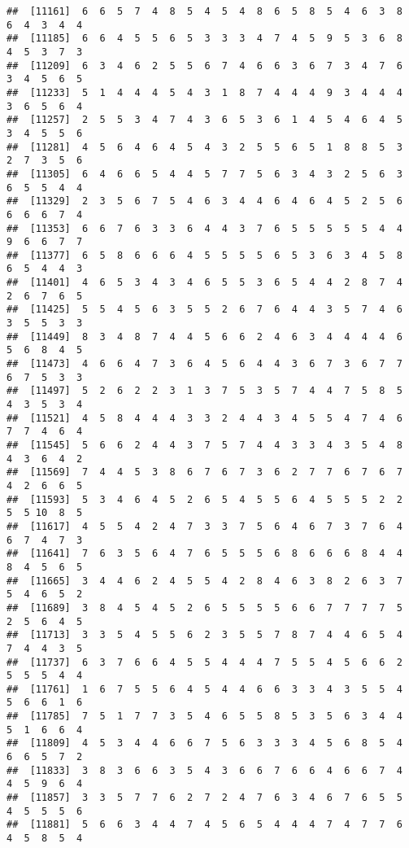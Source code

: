 \documentclass[
]{book}
\begin{document}
\begin{verbatim}
##  [11161]  6  6  5  7  4  8  5  4  5  4  8  6  5  8  5  4  6  3  8  6  4  3  4  4
##  [11185]  6  6  4  5  5  6  5  3  3  3  4  7  4  5  9  5  3  6  8  4  5  3  7  3
##  [11209]  6  3  4  6  2  5  5  6  7  4  6  6  3  6  7  3  4  7  6  3  4  5  6  5
##  [11233]  5  1  4  4  4  5  4  3  1  8  7  4  4  4  9  3  4  4  4  3  6  5  6  4
##  [11257]  2  5  5  3  4  7  4  3  6  5  3  6  1  4  5  4  6  4  5  3  4  5  5  6
##  [11281]  4  5  6  4  6  4  5  4  3  2  5  5  6  5  1  8  8  5  3  2  7  3  5  6
##  [11305]  6  4  6  6  5  4  4  5  7  7  5  6  3  4  3  2  5  6  3  6  5  5  4  4
##  [11329]  2  3  5  6  7  5  4  6  3  4  4  6  4  6  4  5  2  5  6  6  6  6  7  4
##  [11353]  6  6  7  6  3  3  6  4  4  3  7  6  5  5  5  5  5  4  4  9  6  6  7  7
##  [11377]  6  5  8  6  6  6  4  5  5  5  5  6  5  3  6  3  4  5  8  6  5  4  4  3
##  [11401]  4  6  5  3  4  3  4  6  5  5  3  6  5  4  4  2  8  7  4  2  6  7  6  5
##  [11425]  5  5  4  5  6  3  5  5  2  6  7  6  4  4  3  5  7  4  6  3  5  5  3  3
##  [11449]  8  3  4  8  7  4  4  5  6  6  2  4  6  3  4  4  4  4  6  5  6  8  4  5
##  [11473]  4  6  6  4  7  3  6  4  5  6  4  4  3  6  7  3  6  7  7  6  7  5  3  3
##  [11497]  5  2  6  2  2  3  1  3  7  5  3  5  7  4  4  7  5  8  5  4  3  5  3  4
##  [11521]  4  5  8  4  4  4  3  3  2  4  4  3  4  5  5  4  7  4  6  7  7  4  6  4
##  [11545]  5  6  6  2  4  4  3  7  5  7  4  4  3  3  4  3  5  4  8  4  3  6  4  2
##  [11569]  7  4  4  5  3  8  6  7  6  7  3  6  2  7  7  6  7  6  7  4  2  6  6  5
##  [11593]  5  3  4  6  4  5  2  6  5  4  5  5  6  4  5  5  5  2  2  5  5 10  8  5
##  [11617]  4  5  5  4  2  4  7  3  3  7  5  6  4  6  7  3  7  6  4  6  7  4  7  3
##  [11641]  7  6  3  5  6  4  7  6  5  5  5  6  8  6  6  6  8  4  4  8  4  5  6  5
##  [11665]  3  4  4  6  2  4  5  5  4  2  8  4  6  3  8  2  6  3  7  5  4  6  5  2
##  [11689]  3  8  4  5  4  5  2  6  5  5  5  5  6  6  7  7  7  7  5  2  5  6  4  5
##  [11713]  3  3  5  4  5  5  6  2  3  5  5  7  8  7  4  4  6  5  4  7  4  4  3  5
##  [11737]  6  3  7  6  6  4  5  5  4  4  4  7  5  5  4  5  6  6  2  5  5  5  4  4
##  [11761]  1  6  7  5  5  6  4  5  4  4  6  6  3  3  4  3  5  5  4  5  6  6  1  6
##  [11785]  7  5  1  7  7  3  5  4  6  5  5  8  5  3  5  6  3  4  4  5  1  6  6  4
##  [11809]  4  5  3  4  4  6  6  7  5  6  3  3  3  4  5  6  8  5  4  6  6  5  7  2
##  [11833]  3  8  3  6  6  3  5  4  3  6  6  7  6  6  4  6  6  7  4  4  5  9  6  4
##  [11857]  3  3  5  7  7  6  2  7  2  4  7  6  3  4  6  7  6  5  5  4  5  5  5  6
##  [11881]  5  6  6  3  4  4  7  4  5  6  5  4  4  4  7  4  7  7  6  4  5  8  5  4

\end{verbatim}
\end{document}
